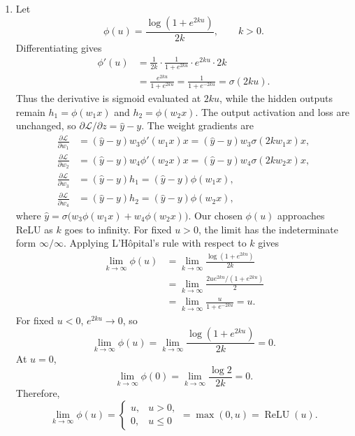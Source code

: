 \documentclass[12pt]{article}
\begin{document}
\begin{enumerate}
\begin{enumerate}[label=\textbf{\Alph*.}, leftmargin=*]
       \item Let
       \[
           \phi(u)=\frac{\log(1+e^{2ku})}{2k},\qquad k>0.
       \]
       Differentiating gives
       \[
       \begin{aligned}
           \phi'(u)
               &=\frac{1}{2k}\cdot\frac{1}{1+e^{2ku}}
                 \cdot e^{2ku}\cdot2k \\
               &=\frac{e^{2ku}}{1+e^{2ku}}
                =\frac{1}{1+e^{-2ku}}
                =\boxed{\sigma(2ku)}.
       \end{aligned}
       \]
       Thus the derivative is sigmoid evaluated at $2ku$, while the
       hidden outputs remain $h_1=\phi(w_1x)$ and $h_2=\phi(w_2x)$.
       The output activation and loss are unchanged, so
       $\partial\mathcal L/\partial z=\hat y-y$. The weight gradients are
       \[
       \begin{aligned}
           \frac{\partial\mathcal L}{\partial w_1}
               &=(\hat y-y)w_3\phi'(w_1x)x
                =\boxed{(\hat y-y)w_3\sigma(2kw_1x)x}, \\
           \frac{\partial\mathcal L}{\partial w_2}
               &=(\hat y-y)w_4\phi'(w_2x)x
                =\boxed{(\hat y-y)w_4\sigma(2kw_2x)x}, \\
           \frac{\partial\mathcal L}{\partial w_3}
               &=(\hat y-y)h_1
                =\boxed{(\hat y-y)\phi(w_1x)}, \\
           \frac{\partial\mathcal L}{\partial w_4}
               &=(\hat y-y)h_2
                =\boxed{(\hat y-y)\phi(w_2x)},
       \end{aligned}
       \]
       where $\hat y=\sigma\bigl(w_3\phi(w_1x)+w_4\phi(w_2x)\bigr)$.
       Our chosen $\phi(u)$ approaches ReLU as $k$ goes to infinity.
       For fixed $u>0$, the limit has the indeterminate form
       $\infty/\infty$. Applying L'H\^opital's rule with respect to $k$ gives
       \[
       \begin{aligned}
           \lim_{k\to\infty}\phi(u)
               &=\lim_{k\to\infty}
                 \frac{\log(1+e^{2ku})}{2k} \\
               &=\lim_{k\to\infty}
                 \frac{2u e^{2ku}/(1+e^{2ku})}{2} \\
               &=\lim_{k\to\infty}\frac{u}{1+e^{-2ku}}
                =u.
       \end{aligned}
       \]
       For fixed $u<0$, $e^{2ku}\to0$, so
       \[
           \lim_{k\to\infty}\phi(u)
           =\lim_{k\to\infty}\frac{\log(1+e^{2ku})}{2k}=0.
       \]
       At $u=0$,
       \[
           \lim_{k\to\infty}\phi(0)
           =\lim_{k\to\infty}\frac{\log2}{2k}=0.
       \]
       Therefore,
       \[
           \boxed{\lim_{k\to\infty}\phi(u)
           =\begin{cases}
               u, & u>0, \\
               0, & u\leq0
           \end{cases}
           =\max(0,u)=\operatorname{ReLU}(u)}.
       \]


\end{enumerate}
\end{enumerate}
\end{document}
